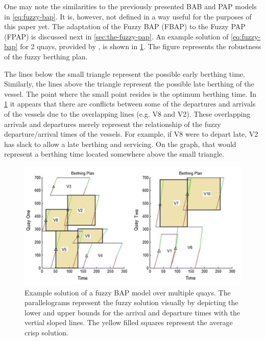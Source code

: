 \documentclass[ee,msthesis]{usuthesis}
\begin{document}
One may note the similarities to the previously presented BAB and PAP models in \ref{eq:fuzzy-bap}. It is, however, not
defined in a way useful for the purposes of this paper yet. The adaptation of the Fuzzy BAP (FBAP) to the Fuzzy PAP
(FPAP) is discussed next in \ref{sec:the-fuzzy-pap}. An example solution of \ref{eq:fuzzy-bap} for 2 quays, provided by
\cite{bello-2019-fuzzy-activ}, is shown in \ref{fig:bap-example-solution}. The figure represents the robustness of the fuzzy
berthing plan.

The lines below the small triangle represent the possible early berthing time. Similarly, the lines above the triangle
represent the possible late berthing of the vessel. The point where the small point resides is the optimum berthing
time. In \ref{fig:bap-example-solution} it appears that there are conflicts between some of the departures and arrivals of the
vessels due to the overlapping lines (e.g. V8 and V2). These overlapping arrivals and departures merely represent the
relationship of the fuzzy departure/arrival times of the vessels. For example, if V8 were to depart late, V2 has slack
to allow a late berthing and servicing. On the graph, that would represent a berthing time located somewhere above the
small triangle.

\begin{figure}[htbp]
\centering
\includegraphics[width=.9\linewidth]{img/bap-example-fuzzy-solution.png}
\caption{\label{fig:bap-example-solution}Example solution of a fuzzy BAP model over multiple quays. The parallelograms represent the fuzzy solution visually by depicting the lower and upper bounds for the arrival and departure times with the vertial sloped lines. The yellow filled squares represent the average crisp solution.}
\end{figure}
\end{document}
